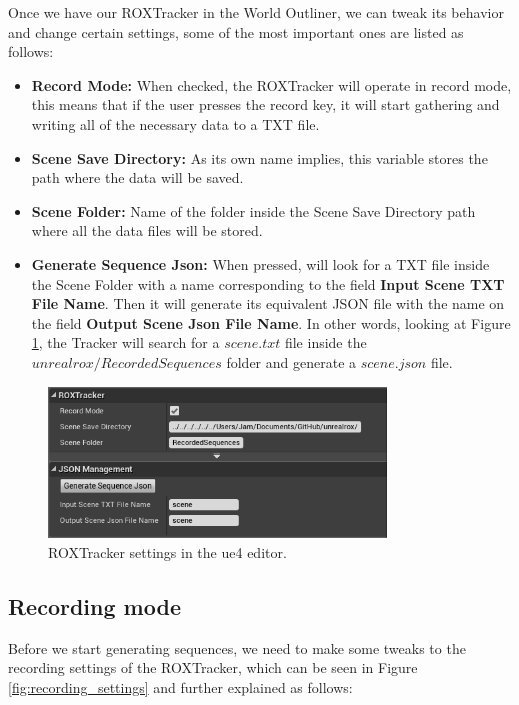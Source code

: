 Once we have our ROXTracker in the World Outliner, we can tweak its behavior and change certain settings, some of the most important ones are listed as follows:

\begin{itemize}
	\item \textbf{Record Mode:} When checked, the ROXTracker will operate in record mode, this means that if the user presses the record key, it will start gathering and writing all of the necessary data to a TXT file.
	\item \textbf{Scene Save Directory:} As its own name implies, this variable stores the path where the data will be saved.
	\item \textbf{Scene Folder:}  Name of the folder inside the Scene Save Directory path where all the data files will be stored.
	\item \textbf{Generate Sequence Json:} When pressed, will look for a TXT file inside the Scene Folder with a name corresponding to the field \textbf{Input Scene TXT File Name}. Then it will generate its equivalent JSON file with the name on the field \textbf{Output Scene Json File Name}. In other words, looking at Figure \ref{fig:tracker_settings}, the Tracker will search for a $scene.txt$ file inside the $unrealrox/RecordedSequences$ folder and generate a $scene.json$ file.
\end{itemize}

\begin{figure}[!ht]
	\includegraphics[width=0.8\textwidth]{archivos/tracker_settings.png}
	\centering
	\caption{ROXTracker settings in the \gls{ue4} editor.}
	\label{fig:tracker_settings}
\end{figure}

\subsection{Recording mode}
\label{sec:recording}

Before we start generating sequences, we need to make some tweaks to the recording settings of the ROXTracker, which can be seen in Figure \ref{fig:recording_settings} and further explained as follows:

